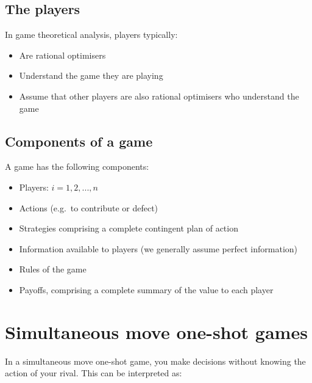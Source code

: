 \documentclass[
  letterpaper,
  DIV=11,
  numbers=noendperiod]{scrreprt}
\begin{document}
\hypertarget{the-players}{%
\section*{The players}\label{the-players}}


In game theoretical analysis, players typically:

\begin{itemize}
\item
  Are rational optimisers
\item
  Understand the game they are playing
\item
  Assume that other players are also rational optimisers who understand
  the game
\end{itemize}

\hypertarget{components-of-a-game}{%
\section*{Components of a game}\label{components-of-a-game}}


A game has the following components:

\begin{itemize}
\item
  Players: \(i=1,2,...,n\)
\item
  Actions (e.g.~to contribute or defect)
\item
  Strategies comprising a complete contingent plan of action
\item
  Information available to players (we generally assume perfect
  information)
\item
  Rules of the game
\item
  Payoffs, comprising a complete summary of the value to each player
\end{itemize}

\hypertarget{simultaneous-move-one-shot-games}{%
\chapter{Simultaneous move one-shot
games}\label{simultaneous-move-one-shot-games}}

In a simultaneous move one-shot game, you make decisions without knowing
the action of your rival. This can be interpreted as:
\end{document}
